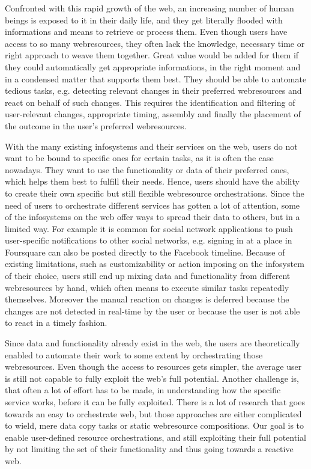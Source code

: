 Confronted with this rapid growth of the \textrm{\gls{web}}, an increasing number of human beings is exposed to it in their daily life, and they get literally flooded with informations and means to retrieve or process them.
Even though users have access to so many \textrm{\glspl{webresource}}, they often lack the knowledge, necessary time or right approach to weave them together.
Great value would be added for them if they could automatically get appropriate informations, in the right moment and in a condensed matter that supports them best.
They should be able to automate tedious tasks, e.g. detecting relevant changes in their preferred \textrm{\glspl{webresource}} and react on behalf of such changes.
This requires the identification and filtering of user-relevant changes, appropriate timing, assembly and finally the placement of the outcome in the user's preferred \textrm{\glspl{webresource}}.

With the many existing \textrm{\glspl{infosystem}} and their services on the \textrm{\gls{web}}, users do not want to be bound to specific ones for certain tasks, as it is often the case nowadays.
They want to use the functionality or data of their preferred ones, which helps them best to fulfill their needs.
Hence, users should have the ability to create their own specific but still flexible \textrm{\gls{webresource}} orchestrations.
Since the need of users to orchestrate different services has gotten a lot of attention, some of the \textrm{\glspl{infosystem}} on the \textrm{\gls{web}} offer ways to spread their data to others, but in a limited way.
For example it is common for social network applications to push user-specific notifications to other social networks, e.g. signing in at a place in \textrm{Foursquare} can also be posted directly to the \textrm{Facebook} timeline.
Because of existing limitations, such as customizability or action imposing on the \textrm{\gls{infosystem}} of their choice, users still end up mixing data and functionality from different \textrm{\glspl{webresource}} by hand, which often means to execute similar tasks repeatedly themselves.
Moreover the manual reaction on changes is deferred because the changes are not detected in real-time by the user or because the user is not able to react in a timely fashion.

Since data and functionality already exist in the \textrm{\gls{web}}, the users are theoretically enabled to automate their work to some extent by orchestrating those \textrm{\glspl{webresource}}.
Even though the access to resources gets simpler, the average user is still not capable to fully exploit the \textrm{\gls{web}}'s full potential.
Another challenge is, that often a lot of effort has to be made, in understanding how the specific service works, before it can be fully exploited.
There is a lot of research that goes towards an easy to orchestrate \textrm{\gls{web}}, but those approaches are either complicated to wield, mere data copy tasks or static \textrm{\gls{webresource}} compositions.
Our goal is to enable user-defined resource orchestrations, and still exploiting their full potential by not limiting the set of their functionality and thus going towards a reactive \textrm{\gls{web}}.

